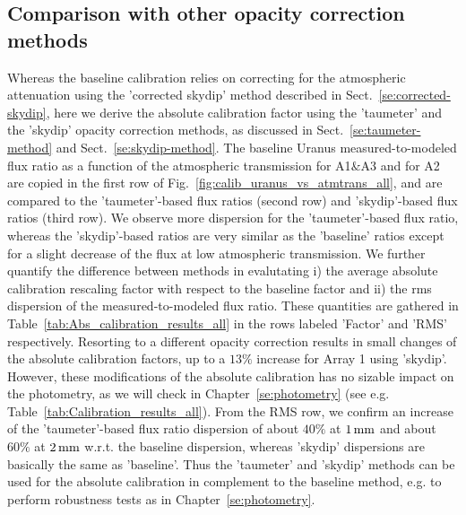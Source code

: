 

\subsection{Comparison with other opacity correction methods}

Whereas the baseline calibration relies on correcting for the
atmospheric attenuation using the 'corrected skydip' method described
in Sect.~\ref{se:corrected-skydip}, here we derive the absolute
calibration factor using the 'taumeter' and the 'skydip' opacity
correction methods, as discussed in Sect.~\ref{se:taumeter-method} and
Sect.~\ref{se:skydip-method}. 
The baseline Uranus measured-to-modeled
flux ratio as a function of the atmospheric transmission for A1$\&$A3
and for A2 are copied in the first row of
Fig.~\ref{fig:calib_uranus_vs_atmtrans_all}, and are
compared to the 'taumeter'-based flux ratios (second row) and
'skydip'-based flux ratios (third row). We observe more dispersion for
the 'taumeter'-based flux ratio, whereas the 'skydip'-based ratios are
very similar as the 'baseline' ratios except for a slight decrease of
the flux at low atmospheric transmission. We further quantify the
difference between methods in evalutating i) the average absolute
calibration rescaling factor with respect to the baseline factor and
ii) the rms dispersion of the measured-to-modeled flux ratio. These
quantities are gathered in Table~\ref{tab:Abs_calibration_results_all}
in the rows labeled 'Factor' and 'RMS' respectively. Resorting to a
different opacity correction results in small changes of the absolute
calibration factors, up to a $13\%$ increase for Array 1 using
'skydip'. However, these modifications of the absolute calibration has
no sizable impact on the photometry, as we will check in
Chapter~\ref{se:photometry} (see
e.g. Table~\ref{tab:Calibration_results_all}). From the RMS row, we
confirm an increase of the 'taumeter'-based flux ratio dispersion of
about $40\%$ at $1\,\rm{mm}$ and about $60\%$ at $2\,\rm{mm}$ w.r.t. the baseline
dispersion, whereas 'skydip' dispersions are basically the same as
'baseline'. Thus the 'taumeter' and 'skydip' methods can be used for
the absolute calibration in complement to the baseline method, e.g. to
perform robustness tests as in Chapter~\ref{se:photometry}.  

  

